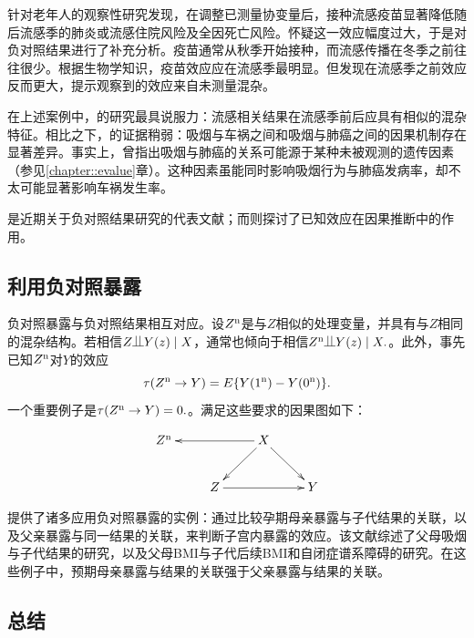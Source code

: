 \begin{example}
针对老年人的观察性研究发现，在调整已测量协变量后，接种流感疫苗显著降低随后流感季的肺炎或流感住院风险及全因死亡风险。\citet{jackson2006evidence}怀疑这一效应幅度过大，于是对负对照结果进行了补充分析。疫苗通常从秋季开始接种，而流感传播在冬季之前往往很少。根据生物学知识，疫苗效应应在流感季最明显。但\citet{jackson2006evidence}发现在流感季之前效应反而更大，提示观察到的效应来自未测量混杂。 
\end{example}

在上述案例中，\citet{jackson2006evidence}的研究最具说服力：流感相关结果在流感季前后应具有相似的混杂特征。相比之下，\citet{Cornfield::1959}的证据稍弱：吸烟与车祸之间和吸烟与肺癌之间的因果机制存在显著差异。事实上，\citet{Fisher::1957}曾指出吸烟与肺癌的关系可能源于某种未被观测的遗传因素（参见\ref{chapter::evalue}章）。这种因素虽能同时影响吸烟行为与肺癌发病率，却不太可能显著影响车祸发生率。  


\citet{lipsitch2010negative}是近期关于负对照结果研究的代表文献；而\citet{rosenbaum1989role}则探讨了已知效应在因果推断中的作用。 

 

\subsection{利用负对照暴露}

 


负对照暴露与负对照结果相互对应。设$Z^\textup{n}$是与$Z$相似的处理变量，并具有与$Z$相同的混杂结构。若相信$Z \ind Y  (z) \mid X$，通常也倾向于相信$
Z^\textup{n}\ind Y  (z) \mid X.
$。此外，事先已知$Z^\textup{n}$对$Y $的效应$$
\tau(Z^\textup{n}\rightarrow Y  )
= 
E\{  Y(1^\textup{n}) - Y (0^\textup{n}) \}.
$$一个重要例子是$\tau(Z^\textup{n}\rightarrow Y  ) = 0.$。满足这些要求的因果图如下：


$$
\xymatrix{
Z^\textup{n} & & X \ar[ll] \ar[ld]\ar[rd] \\
&Z  \ar[rr] && Y 
}
$$




\begin{example}
\citet{sanderson2017negative}提供了诸多应用负对照暴露的实例：通过比较孕期母亲暴露与子代结果的关联，以及父亲暴露与同一结果的关联，来判断子宫内暴露的效应。该文献综述了父母吸烟与子代结果的研究，以及父母BMI与子代后续BMI和自闭症谱系障碍的研究。在这些例子中，预期母亲暴露与结果的关联强于父亲暴露与结果的关联。
\end{example}



\subsection{总结}


